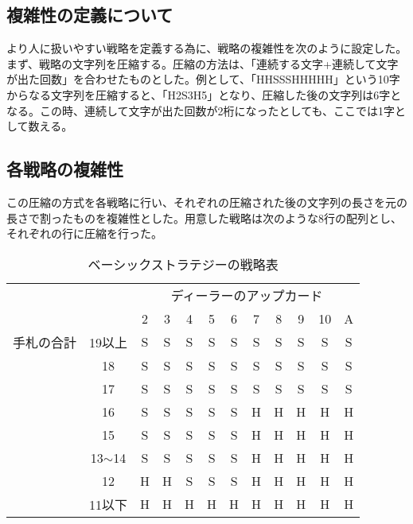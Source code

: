 \subsection{複雑性の定義について}

より人に扱いやすい戦略を定義する為に、戦略の複雑性を次のように設定した。
まず、戦略の文字列を圧縮する。圧縮の方法は、「連続する文字+連続して文字が出た回数」を合わせたものとした。例として、「HHSSSHHHHH」という10字からなる文字列を圧縮すると、「H2S3H5」となり、圧縮した後の文字列は6字となる。この時、連続して文字が出た回数が2桁になったとしても、ここでは1字として数える。

\subsection{各戦略の複雑性}

この圧縮の方式を各戦略に行い、それぞれの圧縮された後の文字列の長さを元の長さで割ったものを複雑性とした。用意した戦略は次のような8行の配列とし、それぞれの行に圧縮を行った。\\

\begin{table}[H]
\caption{ベーシックストラテジーの戦略表}
\label{table:data_type}
\begin{center}
\begin{tabular}{|cc|c|c|c|c|c|c|c|c|c|c|}
\hline
                            &            & \multicolumn{10}{c|}{ディーラーのアップカード}     \\ \cline{3-12} 
                            &            & 2 & 3 & 4 & 5 & 6 & 7 & 8 & 9 & 10 & A \\ \hline
\multicolumn{1}{|l|}{手札の合計} & 19以上       & S & S & S & S & S & S & S & S & S  & S \\ \cline{2-12} 
\multicolumn{1}{|l|}{}      & 18         & S & S & S & S & S & S & S & S & S  & S \\ \cline{2-12} 
\multicolumn{1}{|l|}{}      & 17         & S & S & S & S & S & S & S & S & S  & S \\ \cline{2-12} 
\multicolumn{1}{|l|}{}      & 16         & S & S & S & S & S & H & H & H & H  & H \\ \cline{2-12} 
\multicolumn{1}{|l|}{}      & 15         & S & S & S & S & S & H & H & H & H  & H \\ \cline{2-12} 
\multicolumn{1}{|l|}{}      & 13$\sim$14 & S & S & S & S & S & H & H & H & H  & H \\ \cline{2-12} 
\multicolumn{1}{|l|}{}      & 12         & H & H & S & S & S & H & H & H & H  & H \\ \cline{2-12} 
\multicolumn{1}{|l|}{}      & 11以下       & H & H & H & H & H & H & H & H & H  & H \\ \hline
\end{tabular}
\end{center}
\end{table}


